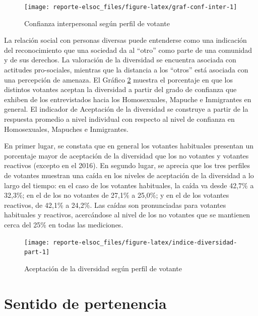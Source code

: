 \documentclass[
  12pt,
]{book}
\begin{document}
\begin{figure}

{\centering \texttt{[image: reporte-elsoc\_files/figure-latex/graf-conf-inter-1]} 

}

\caption{Confianza interpersonal según perfil de votante}\label{fig:graf-conf-inter}
\end{figure}

La relación social con personas diversas puede entenderse como una indicación del reconocimiento que una sociedad da al ``otro'' como parte de una comunidad y de sus derechos. La valoración de la diversidad se encuentra asociada con actitudes pro-sociales, mientras que la distancia a los ``otros'' está asociada con una percepción de amenaza. El Gráfico \ref{fig:indice-diversidad-part} muestra el porcentaje en que los distintos votantes aceptan la diversidad a partir del grado de confianza que exhiben de los entrevistados hacia los Homosexuales, Mapuche e Inmigrantes en general. El indicador de Aceptación de la diversidad se construye a partir de la respuesta promedio a nivel individual con respecto al nivel de confianza en Homosexuales, Mapuches e Inmigrantes.

En primer lugar, se constata que en general los votantes habituales presentan un porcentaje mayor de aceptación de la diversidad que los no votantes y votantes reactivos (excepto en el 2016). En segundo lugar, se aprecia que los tres perfiles de votantes muestran una caída en los niveles de aceptación de la diversidad a lo largo del tiempo: en el caso de los votantes habituales, la caída va desde 42,7\% a 32,3\%; en el de los no votantes de 27,1\% a 25,0\%; y en el de los votantes reactivos, de 42,1\% a 24,2\%. Las caídas son pronunciadas para votantes habituales y reactivos, acercándose al nivel de los no votantes que se mantienen cerca del 25\% en todas las mediciones.

\begin{figure}

{\centering \texttt{[image: reporte-elsoc\_files/figure-latex/indice-diversidad-part-1]} 

}

\caption{Aceptación de la diversidad según perfil de votante}\label{fig:indice-diversidad-part}
\end{figure}

\hypertarget{sentido-de-pertenencia}{%
\section{Sentido de pertenencia}\label{sentido-de-pertenencia}}
\end{document}
